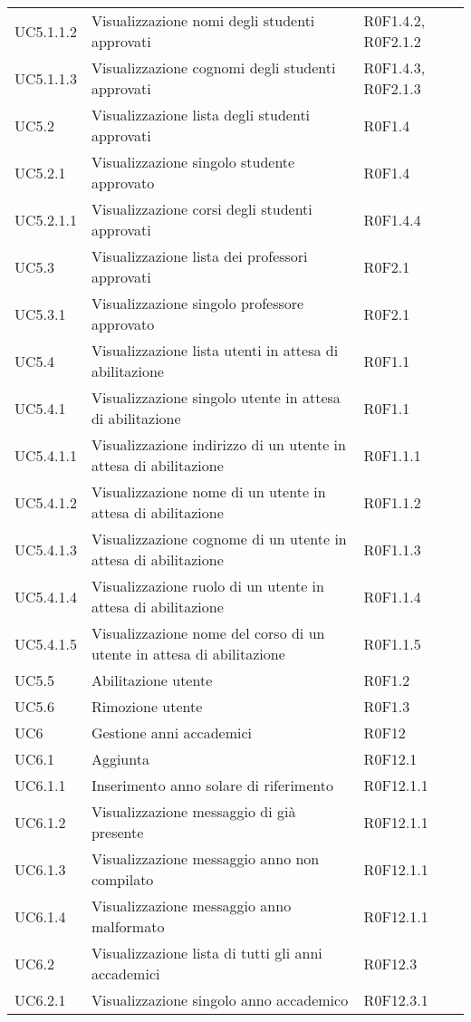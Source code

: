 \documentclass[AnalisiDeiRequisiti.tex]{subfiles}
\begin{document}
\begin{longtable}[H]{p{2cm}p{5cm}p{5cm}}
	UC5.1.1.2 & Visualizzazione nomi degli studenti approvati & R0F1.4.2, R0F2.1.2 \\
	UC5.1.1.3 & Visualizzazione cognomi degli studenti approvati & R0F1.4.3, R0F2.1.3 \\
	UC5.2 & Visualizzazione lista degli studenti approvati & R0F1.4 \\
	UC5.2.1 & Visualizzazione singolo studente approvato & R0F1.4 \\
	UC5.2.1.1 & Visualizzazione corsi degli studenti approvati & R0F1.4.4 \\
	UC5.3 & Visualizzazione lista dei professori approvati & R0F2.1 \\
	UC5.3.1 & Visualizzazione singolo professore approvato & R0F2.1 \\
	UC5.4 & Visualizzazione lista utenti in attesa di abilitazione & R0F1.1 \\
	UC5.4.1 & Visualizzazione singolo utente in attesa di abilitazione & R0F1.1 \\
	UC5.4.1.1 & Visualizzazione indirizzo di un utente in attesa di abilitazione & R0F1.1.1 \\
	UC5.4.1.2 & Visualizzazione nome di un utente in attesa di abilitazione & R0F1.1.2 \\
	UC5.4.1.3 & Visualizzazione cognome di un utente in attesa di abilitazione & R0F1.1.3 \\
	UC5.4.1.4 & Visualizzazione ruolo di un utente in attesa di abilitazione &R0F1.1.4  \\
	UC5.4.1.5 & Visualizzazione nome del corso di un utente in attesa di abilitazione & R0F1.1.5 \\
	UC5.5 & Abilitazione utente & R0F1.2 \\
	UC5.6 & Rimozione utente & R0F1.3 \\
	UC6 & Gestione anni accademici & R0F12 \\
	UC6.1 & Aggiunta \citGloss{anno accademico} & R0F12.1 \\
	UC6.1.1 & Inserimento anno solare di riferimento & R0F12.1.1 \\
	UC6.1.2 & Visualizzazione messaggio di \citGloss{anno accademico} già presente & R0F12.1.1 \\
	UC6.1.3 & Visualizzazione messaggio anno non compilato & R0F12.1.1 \\
	UC6.1.4 & Visualizzazione messaggio anno malformato & R0F12.1.1 \\
	UC6.2 & Visualizzazione lista di tutti gli anni accademici & R0F12.3 \\
	UC6.2.1 & Visualizzazione singolo anno accademico & R0F12.3.1 \\

\end{longtable}
\end{document}
